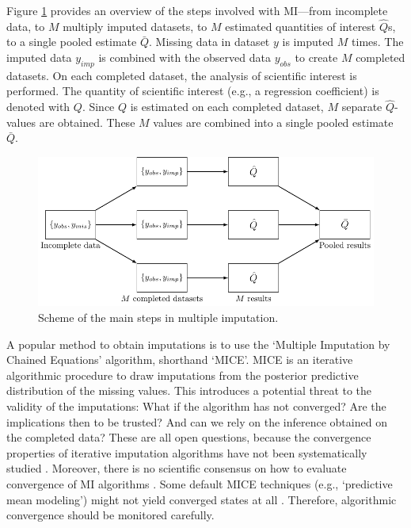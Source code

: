\documentclass[Royal,times,sageh]{sagej}
\begin{document}
Figure \ref{fig:diagram} provides an overview of the steps involved with
MI---from incomplete data, to \(M\) multiply imputed datasets, to \(M\)
estimated quantities of interest \(\hat{Q}\)s, to a single pooled
estimate \(\bar{Q}\). Missing data in dataset \(y\) is imputed \(M\)
times. The imputed data \(y_{imp}\) is combined with the observed data
\(y_{obs}\) to create \(M\) completed datasets. On each completed
dataset, the analysis of scientific interest is performed. The quantity
of scientific interest (e.g., a regression coefficient) is denoted with
\(Q\). Since \(Q\) is estimated on each completed dataset, \(M\)
separate \(\hat{Q}\)-values are obtained. These \(M\) values are
combined into a single pooled estimate \(\bar{Q}\).

\begin{figure}

{\centering \includegraphics[width=\linewidth]{./images/diagram} 

}

\caption{Scheme of the main steps in multiple imputation.}\label{fig:diagram}
\end{figure}

A popular method to obtain imputations is to use the `Multiple
Imputation by Chained Equations' algorithm, shorthand
`MICE'\citep{mice}. MICE is an iterative algorithmic procedure to draw
imputations from the posterior predictive distribution of the missing
values. This introduces a potential threat to the validity of the
imputations: What if the algorithm has not converged? Are the
implications then to be trusted? And can we rely on the inference
obtained on the completed data? These are all open questions, because
the convergence properties of iterative imputation algorithms have not
been systematically studied \citep{buur18}. Moreover, there is no
scientific consensus on how to evaluate convergence of MI algorithms
\citep{taka17}. Some default MICE techniques (e.g., `predictive mean
modeling') might not yield converged states at all \citep{murr18}.
Therefore, algorithmic convergence should be monitored carefully.
\end{document}
